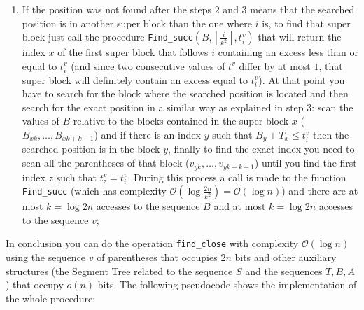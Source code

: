\documentclass{article}
\begin{document}
\begin{enumerate}
        \item If the position was not found after the steps $2$ and $3$ means that the searched position is in another super block than the one where $i$ is, to find that super block just call the procedure \texttt{Find\_succ}$(B,\left\lfloor{\frac{i}{k^2}}\right\rfloor,t^v_i)$ that will return the index $x$ of the first super block that follows $i$ containing an excess less than or equal to $t^v_i$ (and since two consecutive values of $t^v$ differ by at most $1$, that super block will definitely contain an excess equal to $t^v_i$). At that point you have to search for the block where the searched position is located and then search for the exact position in a similar way as explained in step $3$: scan the values of $B$ relative to the blocks contained in the super block $x$ ($B_{xk},\dots,B_{xk+k-1}$) and if there is an index $y$ such that $B_y+T_x \leq t^v_i$ then the searched position is in the block $y$, finally to find the exact index you need to scan all the parentheses of that block ($v_{yk},\dots,v_{yk+k-1}$) until you find the first index $z$ such that $t^v_z=t^v_i$. During this process a call is made to the function \texttt{Find\_succ} (which has complexity $\mathcal{O}(\log{\frac{2n}{k^2}})=\mathcal{O}(\log{n})$) and there are at most $k=\log{2n}$ accesses to the sequence $B$ and at most $k=\log{2n}$ accesses to the sequence $v$;
    \end{enumerate}
In conclusion you can do the operation \texttt{find\_close} with complexity $\mathcal{O}(\log{n})$ using the sequence $v$ of parentheses that occupies $2n$ bits and other auxiliary structures (the Segment Tree related to the sequence $S$ and the sequences $T,B,A$) that occupy $o(n)$ bits. The following pseudocode shows the implementation of the whole procedure:
\end{document}
